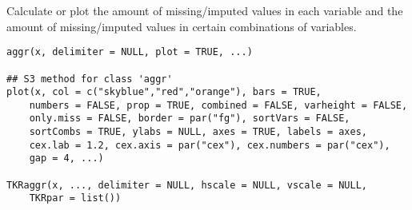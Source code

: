 %
\begin{Description}\relax
Calculate or plot the amount of missing/imputed values
in each variable and the amount of missing/imputed values
in certain combinations of variables.
\end{Description}
%
\begin{Usage}
\begin{verbatim}
aggr(x, delimiter = NULL, plot = TRUE, ...)

## S3 method for class 'aggr'
plot(x, col = c("skyblue","red","orange"), bars = TRUE,
    numbers = FALSE, prop = TRUE, combined = FALSE, varheight = FALSE,
    only.miss = FALSE, border = par("fg"), sortVars = FALSE,
    sortCombs = TRUE, ylabs = NULL, axes = TRUE, labels = axes,
    cex.lab = 1.2, cex.axis = par("cex"), cex.numbers = par("cex"),
    gap = 4, ...)

TKRaggr(x, ..., delimiter = NULL, hscale = NULL, vscale = NULL,
    TKRpar = list())
\end{verbatim}
\end{Usage}
%
